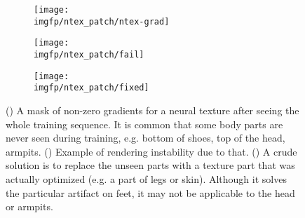 \begin{figure}
	\centering
	\begin{subfigure}[b]{0.35\textwidth}
		\centering
		\texttt{[image: \\imgfp/ntex\_patch/ntex-grad]}%
		\caption{}
		\label{fig:ntex-grad}
	\end{subfigure}
	\hfill
	\begin{subfigure}[b]{0.3\textwidth}
		\centering
		\texttt{[image: \\imgfp/ntex\_patch/fail]}
		\caption{}
		\label{fig:ntex-artifact}
	\end{subfigure}
	\hfill
	\begin{subfigure}[b]{0.3\textwidth}
		\centering
		\texttt{[image: \\imgfp/ntex\_patch/fixed]}
		\caption{}
		\label{fig:ntex-fixed}
	\end{subfigure}
	\caption{(\protect{}) A mask of non-zero gradients for a neural texture after seeing the whole training sequence. It is common that some body parts are never seen during training, e.g. bottom of shoes, top of the head, armpits. (\protect{}) Example of rendering instability due to that. (\protect{}) A crude solution is to replace the unseen parts with a texture part that was actually optimized (e.g. a part of legs or skin). Although it solves the particular artifact on feet, it may not be applicable to the head or armpits.}
\end{figure}
